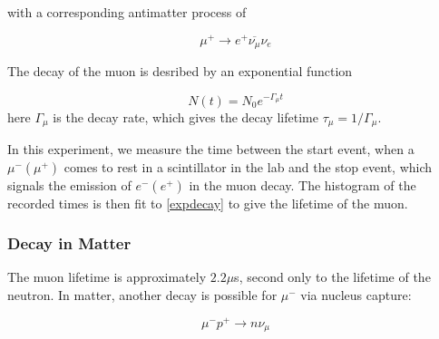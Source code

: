 with a corresponding antimatter process of

\begin{equation}\mu^+ \rightarrow e^+ \overline{\nu_{\mu}}{\nu_e}\label{antimudecay}\end{equation}


\begin{center}
\end{center}


The decay of the muon is desribed by an exponential function

\begin{equation} N(t) = N_0 e^{-\Gamma_{\mu} t} \label{expdecay}\end{equation} 
here $\Gamma_{\mu}$ is the decay rate, which gives the decay lifetime
$\tau_{\mu} = 1/\Gamma_{\mu}$.

In this experiment, we measure the time between the start event, when
a $\mu^- (\mu^+)$ comes to rest in a scintillator in the lab and the
stop event, which signals the emission of $e^- (e^+)$ in the muon
decay. The histogram of the recorded times is then fit to
\eqref{expdecay} to give the lifetime of the muon.

\subsubsection{Decay in Matter}

The muon lifetime is approximately $2.2 \mu$s\cite{easwar}, second
only to the lifetime of the neutron. In matter, another decay is
possible for $\mu^-$ via nucleus capture:

\begin{equation}\mu^-p^+ \rightarrow n \nu_{\mu} \label{pcap} \end{equation}

